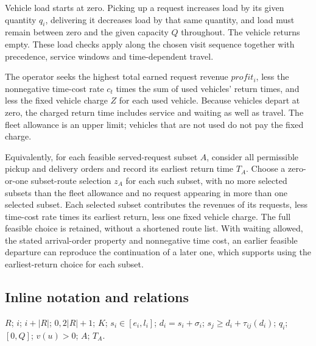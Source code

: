 \documentclass[10pt]{article}
\begin{document}
Vehicle load starts at zero. Picking up a request increases load by its given quantity $q_i$, delivering it decreases load by that same quantity, and load must remain between zero and the given capacity $Q$ throughout. The vehicle returns empty. These load checks apply along the chosen visit sequence together with precedence, service windows and time-dependent travel.

The operator seeks the highest total earned request revenue $profit_i$, less the nonnegative time-cost rate $c_t$ times the sum of used vehicles' return times, and less the fixed vehicle charge $Z$ for each used vehicle. Because vehicles depart at zero, the charged return time includes service and waiting as well as travel. The fleet allowance is an upper limit; vehicles that are not used do not pay the fixed charge.

Equivalently, for each feasible served-request subset $A$, consider all permissible pickup and delivery orders and record its earliest return time $T_A$. Choose a zero-or-one subset-route selection $z_A$ for each such subset, with no more selected subsets than the fleet allowance and no request appearing in more than one selected subset. Each selected subset contributes the revenues of its requests, less time-cost rate times its earliest return, less one fixed vehicle charge. The full feasible choice is retained, without a shortened route list. With waiting allowed, the stated arrival-order property and nonnegative time cost, an earlier feasible departure can reproduce the continuation of a later one, which supports using the earliest-return choice for each subset.

\subsection*{Inline notation and relations}
$R$; $i$; $i+|R|$; $0,2|R|+1$; $K$; $s_i\in[e_i,l_i]$; $d_i=s_i+\sigma_i$; $s_j\ge d_i+\tau_{ij}(d_i)$; $q_i$; $[0,Q]$; $v(u)>0$; $A$; $T_A$.
\end{document}

